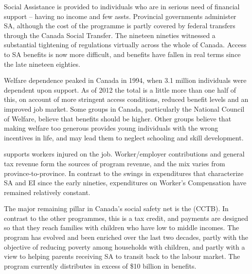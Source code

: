 Social Assistance is provided to individuals who are in serious need of financial support -- having no income and few assts. Provincial governments administer SA, although the cost of the programme is partly covered by federal transfers through the Canada Social Transfer. The nineteen nineties witnessed a substantial tightening of regulations virtually across the whole of Canada. Access to SA benefits is now more difficult, and benefits have fallen in real terms since the late nineteen eighties.

Welfare dependence peaked in Canada in 1994, when 3.1 million individuals were dependent upon support. As of 2012 the total is a little more than one half of this, on account of more stringent access conditions, reduced benefit levels and an improved job market. Some groups in Canada, particularly the National Council of Welfare, believe that benefits should be higher. Other groups believe that making welfare too generous provides young individuals with the wrong incentives in life, and may lead them to neglect schooling and skill development. 

 supports workers injured on the job. Worker/employer contributions and general tax revenue form the sources of program revenue, and the mix varies from province-to-province. In contrast to the swings in expenditures that characterize SA and EI since the early nineties, expenditures on Worker's Compensation have remained relatively constant.

The major remaining pillar in Canada's social safety net is the (CCTB). In contrast to the other programmes, this is a tax credit, and payments are designed so that they reach families with children who have low to middle incomes. The program has evolved and been enriched over the last two decades, partly with the objective of reducing poverty among households with children, and partly with a view to helping parents receiving SA to transit back to the labour market. The program currently distributes in excess of \$10 billion in benefits.

